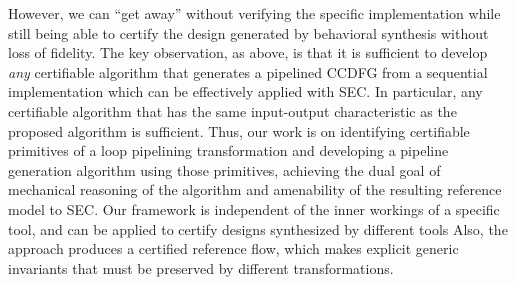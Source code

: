 However, we can ``get away'' without verifying
the specific implementation while still being able to
certify the design generated by behavioral synthesis without
loss of fidelity. The key observation, as above, is that it
is sufficient to develop {\em any} certifiable algorithm
that generates a pipelined CCDFG from a sequential
implementation which can be effectively applied with SEC.
In particular, any certifiable algorithm that has the same
input-output characteristic as the proposed algorithm
is sufficient.  Thus, our work is on identifying
certifiable primitives of a loop pipelining
transformation and developing a pipeline generation
algorithm using those primitives, achieving the dual goal of
mechanical reasoning of the algorithm and amenability of the
resulting reference model to SEC. Our framework is independent of the inner workings of a specific tool, 
and can be applied to certify designs synthesized by different tools 
Also, the approach produces a certified reference flow, 
which makes explicit generic invariants that must be preserved by different transformations. 







